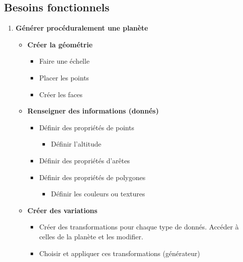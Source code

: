 \documentclass[a4paper]{article}
\begin{document}
\subsection{Besoins fonctionnels}
\begin{enumerate}

    \item \textbf{Générer procéduralement une planète}
    \begin{itemize}
        \item \textbf{Créer la géométrie}
            \begin{itemize}
                \item {Faire une échelle}
                \item {Placer les points}
                \item {Créer les faces}
            \end{itemize}
            
        \item \textbf{Renseigner des informations (donnés)}
            \begin{itemize}
                
                \item {Définir des propriétés de points}
                    \begin{itemize}
                    \item {Définir l'altitude}
                    \end{itemize}
                \item {Définir des propriétés d'arêtes}
                \item {Définir des propriétés de polygones}
                \begin{itemize}
                    \item {Définir les couleurs ou textures}
                \end{itemize}
            \end{itemize}
            
        \item \textbf{Créer des variations}
        \begin{itemize}
                \item Créer des transformations pour chaque type de donnés. Accéder à celles de la planète et les modifier.
                
                \item {Choisir et appliquer ces transformations (générateur)}
        \end{itemize}
        

\end{itemize}
\end{enumerate}
\end{document}
